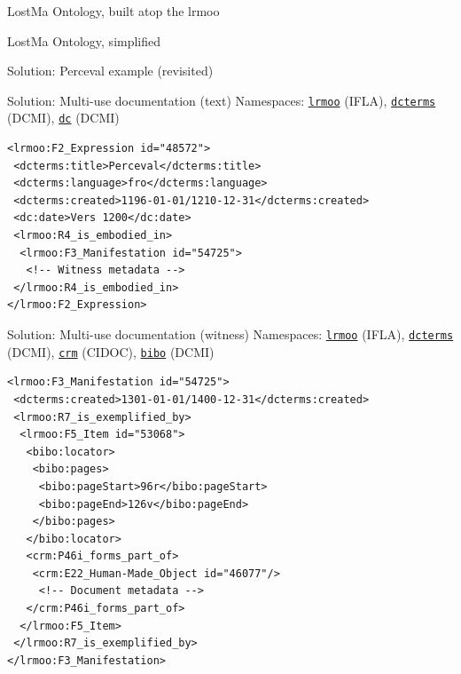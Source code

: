 \documentclass[xcolor=table]{beamer}
\begin{document}
\begin{frame}{LostMa Ontology, built atop the \ac{lrmoo}}
    \begin{adjustbox}{max totalsize={\textwidth}{0.9\textheight},center}
	
	\end{adjustbox}
\end{frame}

\begin{frame}{LostMa Ontology, simplified}
    \begin{adjustbox}{max totalsize={\textwidth}{0.9\textheight},center}
	
	\end{adjustbox}
\end{frame}

\begin{frame}{Solution: Perceval example (revisited)}
    \begin{adjustbox}{max totalsize={\textwidth}{0.9\textheight},center}
	
	\end{adjustbox}
\end{frame}

\begin{frame}[containsverbatim]{Solution: Multi-use documentation (text)}
Namespaces:
    \texttt{\href{http://iflastandards.info/ns/lrm/lrmoo}{lrmoo}} (IFLA),
    \texttt{\href{http://purl.org/dc/terms/1.1}{dcterms}} (DCMI),
    \texttt{\href{http://purl.org/dc/elements/1.1}{dc}} (DCMI)
\begin{verbatim}
<lrmoo:F2_Expression id="48572">
 <dcterms:title>Perceval</dcterms:title>
 <dcterms:language>fro</dcterms:language>
 <dcterms:created>1196-01-01/1210-12-31</dcterms:created>
 <dc:date>Vers 1200</dc:date>
 <lrmoo:R4_is_embodied_in>
  <lrmoo:F3_Manifestation id="54725">
   <!-- Witness metadata -->
 </lrmoo:R4_is_embodied_in>
</lrmoo:F2_Expression>
\end{verbatim}
\end{frame}

\begin{frame}[containsverbatim]{Solution: Multi-use documentation (witness)}
Namespaces:
  \texttt{\href{http://iflastandards.info/ns/lrm/lrmoo}{lrmoo}} (IFLA),
    \texttt{\href{http://purl.org/dc/terms/1.1}{dcterms}} (DCMI),
    \texttt{\href{http://www.cidoc-crm.org/cidoc-crm}{crm}} (CIDOC),
    \texttt{\href{http://purl.org/ontology/bibo}{bibo}} (DCMI)
\scriptsize
\begin{verbatim}
<lrmoo:F3_Manifestation id="54725">
 <dcterms:created>1301-01-01/1400-12-31</dcterms:created>
 <lrmoo:R7_is_exemplified_by>
  <lrmoo:F5_Item id="53068">
   <bibo:locator>
    <bibo:pages>
     <bibo:pageStart>96r</bibo:pageStart>
     <bibo:pageEnd>126v</bibo:pageEnd>
    </bibo:pages>
   </bibo:locator>
   <crm:P46i_forms_part_of>
    <crm:E22_Human-Made_Object id="46077"/>
     <!-- Document metadata -->
   </crm:P46i_forms_part_of>
  </lrmoo:F5_Item>
 </lrmoo:R7_is_exemplified_by>
</lrmoo:F3_Manifestation>
\end{verbatim}
\end{frame}
\end{document}
